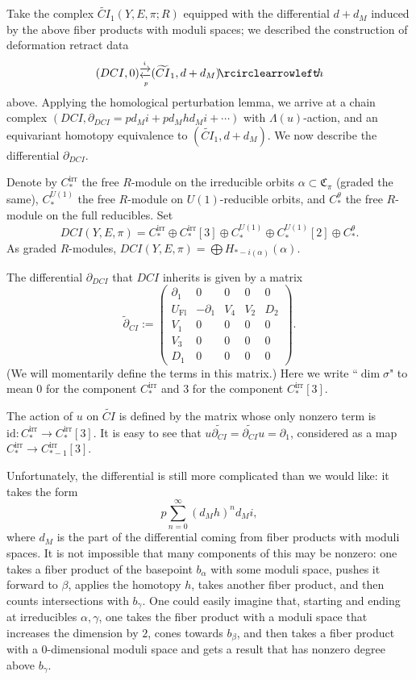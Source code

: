 \documentclass{memo-l}
\theoremstyle{definition}
\theoremstyle{remark}
\numberwithin{section}{chapter}
\numberwithin{equation}{chapter}
\begin{document}
Take the complex $\widetilde{CI}_1(Y,E,\pi;R)$ equipped with the differential $d+d_M$ induced by the above fiber products with moduli spaces; we described the construction of deformation retract data $$(DCI,0) \substack{\xrightarrow{i}\\ \xleftarrow[p]{}} (\widetilde{CI}_1,d+d_M) \! \rcirclearrowleft \! h$$ above. Applying the homological perturbation lemma, we arrive at a chain complex $(DCI, \partial_{DCI} = pd_M i + p d_M h d_M i + \cdots)$ with $\Lambda(u)$-action, and an equivariant homotopy equivalence to $(\widetilde{CI}_1, d+d_M)$. We now describe the differential $\partial_{DCI}$. 

Denote by $C_*^\text{irr}$ the free $R$-module on the irreducible orbits $\alpha \subset \mathfrak C_\pi$ (graded the same), $C_*^{U(1)}$ the free $R$-module on $U(1)$-reducible orbits, and $C_*^\theta$ the free $R$-module on the full reducibles. Set $$DCI(Y,E,\pi) = C_*^\text{irr} \oplus C_*^\text{irr}[3] \oplus C_*^{U(1)} \oplus C_*^{U(1)}[2] \oplus C_*^\theta.$$ As graded $R$-modules, $DCI(Y,E,\pi) = \bigoplus H_{*-i(\alpha)}(\alpha)$. 

The differential $\partial_{DCI}$ that $DCI$ inherits is given by a matrix 
$$\widetilde{\partial}_{CI} := \begin{pmatrix}\partial_1 & 0 & 0 & 0 & 0\\
U_{\text{Fl}} & -\partial_1 & V_4 & V_2 & D_2 \\
V_1 & 0 & 0 & 0 & 0\\ 
V_3 & 0 & 0 & 0 & 0\\
D_1 & 0 & 0 & 0 & 0\end{pmatrix}.$$ 
(We will momentarily define the terms in this matrix.) Here we write ``$\dim \sigma$" to mean $0$ for the component $C_*^{\text{irr}}$ and $3$ for the component $C_*^{\text{irr}}[3]$. 

The action of $u$ on $\widetilde{CI}$ is defined by the matrix whose only nonzero term is $\text{id}: C_*^\text{irr} \to C_*^\text{irr}[3]$. It is easy to see that $u\widetilde{\partial_{CI}} = \widetilde{\partial_{CI}}u = \partial_1$, considered as a map $C_*^\text{irr} \to C_{*-1}^\text{irr}[3]$.

Unfortunately, the differential is still more complicated than we would like: it takes the form $$p\sum_{n=0}^\infty (d_M h)^n d_M i,$$ where $d_M$ is the part of the differential coming from fiber products with moduli spaces. It is not impossible that many components of this may be nonzero: one takes a fiber product of the basepoint $b_\alpha$ with some moduli space, pushes it forward to $\beta$, applies the homotopy $h$, takes another fiber product, and then counts intersections with $b_\gamma$. One could easily imagine that, starting and ending at irreducibles $\alpha, \gamma$, one takes the fiber product with a moduli space that increases the dimension by $2$, cones towards $b_\beta$, and then takes a fiber product with a $0$-dimensional moduli space and gets a result that has nonzero degree above $b_\gamma$.
\end{document}
